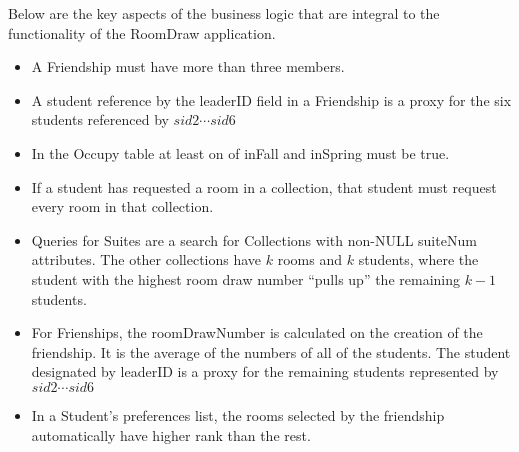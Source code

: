 \documentclass{article}
\begin{document}
\noindent Below are the key aspects of the business logic that are integral to the functionality of
the RoomDraw application.  

\begin{itemize}
\item A Friendship must have more than three members.
\item A student reference by the leaderID field in a Friendship is a proxy for the
  six students referenced by $sid2 \cdots sid6$
\item In the Occupy table at least on of inFall and inSpring must be true.
\item If a student has requested a room in a collection, that student must request every
  room in that collection.
\item Queries for Suites are a search for Collections with non-NULL suiteNum attributes. The other
  collections have $k$ rooms and $k$ students, where the student with the highest room draw number
  ``pulls up'' the remaining $k-1$ students.
\item For Frienships, the roomDrawNumber is calculated on the creation of the friendship.  It is
  the average of the numbers of all of the students.  The student designated by leaderID is a proxy
  for the remaining students represented by $sid2 \cdots sid6$
\item In a Student's preferences list, the rooms selected by the friendship automatically have higher
  rank than the rest.
\end{itemize}
\end{document}
